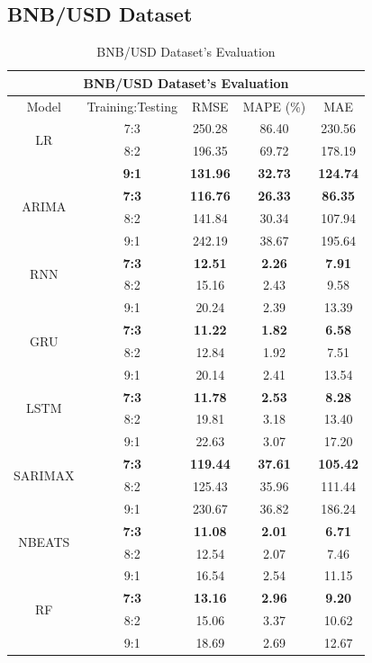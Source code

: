 \documentclass{ieeeojies}
\begin{document}
\subsection{BNB/USD Dataset}
\begin{table}[H]
	\centering
	\begin{tabular}{|c|c|c|c|c|}
		\hline
		\multicolumn{5}{|c|}{\textbf{BNB/USD Dataset's Evaluation}}\\
		\hline
		\centering Model & Training:Testing & RMSE & MAPE (\%) & MAE\\
		\hline
		\multirow{2}{*}{LR} & 7:3 & 250.28 &  86.40 &  230.56\\ & 8:2 & 196.35 & 69.72 & 178.19 \\ & \textbf{9:1} & \textbf{131.96} & \textbf{32.73} & \textbf{124.74}\\
		\hline
		\multirow{2}{*}{ARIMA} & \textbf{7:3} & \textbf{116.76} & \textbf{26.33} & \textbf{86.35} \\ & 8:2 & 141.84 & 30.34 & 107.94 \\ & 9:1 & 242.19 & 38.67 & 195.64\\
		\hline
		\multirow{2}{*}{RNN} & \textbf{7:3} & \textbf{12.51} & \textbf{2.26} & \textbf{7.91}\\ & 8:2& 15.16 & 2.43 & 9.58 \\ & 9:1 & 20.24 & 2.39 & 13.39\\
		\hline
		\multirow{2}{*}{GRU} & \textbf{7:3}	& \textbf{11.22} & \textbf{1.82} &  \textbf{6.58} \\ & 8:2 & 12.84 & 1.92 & 7.51 \\ & 9:1 & 20.14  & 2.41 & 13.54\\
		\hline
		\multirow{2}{*}{LSTM} & \textbf{7:3} &  \textbf{11.78} &  \textbf{2.53} & \textbf{8.28} \\ & 8:2 &  19.81 & 3.18 & 13.40 \\ & 9:1 &  22.63  & 3.07 & 17.20\\
		\hline
		\multirow{2}{*}{SARIMAX} & \textbf{7:3}	& \textbf{119.44} & \textbf{37.61} &  \textbf{105.42} \\ & 8:2 & 125.43 & 35.96 & 111.44 \\ & 9:1 & 230.67 &  36.82 & 186.24\\
		\hline
		\multirow{2}{*}{NBEATS} & \textbf{7:3} & \textbf{11.08} & \textbf{2.01} & \textbf{6.71} \\ & 8:2 & 12.54 & 2.07 & 7.46 \\ & 9:1 & 16.54	& 2.54 & 11.15 \\
		\hline
		\multirow{2}{*}{RF} & \textbf{7:3} & \textbf{13.16} & \textbf{2.96} & \textbf{9.20} \\ & 8:2 & 15.06 & 3.37 & 10.62 \\ & 9:1 & 18.69 & 2.69 & 12.67 \\
		\hline
	\end{tabular}
	\caption{BNB/USD Dataset's Evaluation}
	\label{ethresult}
\end{table}
\end{document}
